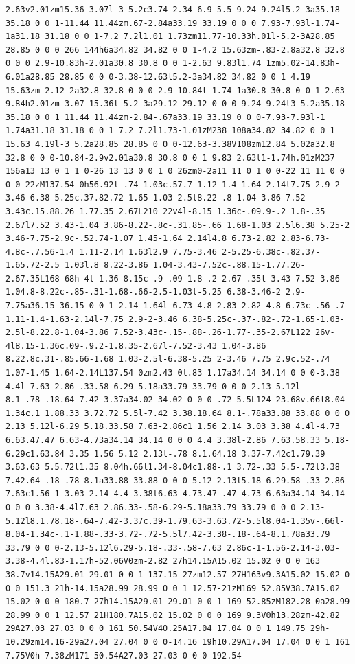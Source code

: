 \documentclass[11pt]{article}
\begin{document}
\begin{enumerate}
\begin{verbatim}
2.63v2.01zm15.36-3.07l-3-5.2c3.74-2.34 6.9-5.5 9.24-9.24l5.2 3a35.18 35.18 0 0 1-11.44 11.44zm.67-2.84a33.19 33.19 0 0 0 7.93-7.93l-1.74-1a31.18 31.18 0 0 1-7.2 7.2l1.01 1.73zm11.77-10.33h.01l-5.2-3A28.85 28.85 0 0 0 266 144h6a34.82 34.82 0 0 1-4.2 15.63zm-.83-2.8a32.8 32.8 0 0 0 2.9-10.83h-2.01a30.8 30.8 0 0 1-2.63 9.83l1.74 1zm5.02-14.83h-6.01a28.85 28.85 0 0 0-3.38-12.63l5.2-3a34.82 34.82 0 0 1 4.19 15.63zm-2.12-2a32.8 32.8 0 0 0-2.9-10.84l-1.74 1a30.8 30.8 0 0 1 2.63 9.84h2.01zm-3.07-15.36l-5.2 3a29.12 29.12 0 0 0-9.24-9.24l3-5.2a35.18 35.18 0 0 1 11.44 11.44zm-2.84-.67a33.19 33.19 0 0 0-7.93-7.93l-1 1.74a31.18 31.18 0 0 1 7.2 7.2l1.73-1.01zM238 108a34.82 34.82 0 0 1 15.63 4.19l-3 5.2a28.85 28.85 0 0 0-12.63-3.38V108zm12.84 5.02a32.8 32.8 0 0 0-10.84-2.9v2.01a30.8 30.8 0 0 1 9.83 2.63l1-1.74h.01zM237 156a13 13 0 1 1 0-26 13 13 0 0 1 0 26zm0-2a11 11 0 1 0 0-22 11 11 0 0 0 0 22zM137.54 0h56.92l-.74 1.03c.57.7 1.12 1.4 1.64 2.14l7.75-2.9 2 3.46-6.38 5.25c.37.82.72 1.65 1.03 2.5l8.22-.8 1.04 3.86-7.52 3.43c.15.88.26 1.77.35 2.67L210 22v4l-8.15 1.36c-.09.9-.2 1.8-.35 2.67l7.52 3.43-1.04 3.86-8.22-.8c-.31.85-.66 1.68-1.03 2.5l6.38 5.25-2 3.46-7.75-2.9c-.52.74-1.07 1.45-1.64 2.14l4.8 6.73-2.82 2.83-6.73-4.8c-.7.56-1.4 1.11-2.14 1.63l2.9 7.75-3.46 2-5.25-6.38c-.82.37-1.65.72-2.5 1.03l.8 8.22-3.86 1.04-3.43-7.52c-.88.15-1.77.26-2.67.35L168 68h-4l-1.36-8.15c-.9-.09-1.8-.2-2.67-.35l-3.43 7.52-3.86-1.04.8-8.22c-.85-.31-1.68-.66-2.5-1.03l-5.25 6.38-3.46-2 2.9-7.75a36.15 36.15 0 0 1-2.14-1.64l-6.73 4.8-2.83-2.82 4.8-6.73c-.56-.7-1.11-1.4-1.63-2.14l-7.75 2.9-2-3.46 6.38-5.25c-.37-.82-.72-1.65-1.03-2.5l-8.22.8-1.04-3.86 7.52-3.43c-.15-.88-.26-1.77-.35-2.67L122 26v-4l8.15-1.36c.09-.9.2-1.8.35-2.67l-7.52-3.43 1.04-3.86 8.22.8c.31-.85.66-1.68 1.03-2.5l-6.38-5.25 2-3.46 7.75 2.9c.52-.74 1.07-1.45 1.64-2.14L137.54 0zm2.43 0l.83 1.17a34.14 34.14 0 0 0-3.38 4.4l-7.63-2.86-.33.58 6.29 5.18a33.79 33.79 0 0 0-2.13 5.12l-8.1-.78-.18.64 7.42 3.37a34.02 34.02 0 0 0-.72 5.5L124 23.68v.66l8.04 1.34c.1 1.88.33 3.72.72 5.5l-7.42 3.38.18.64 8.1-.78a33.88 33.88 0 0 0 2.13 5.12l-6.29 5.18.33.58 7.63-2.86c1 1.56 2.14 3.03 3.38 4.4l-4.73 6.63.47.47 6.63-4.73a34.14 34.14 0 0 0 4.4 3.38l-2.86 7.63.58.33 5.18-6.29c1.63.84 3.35 1.56 5.12 2.13l-.78 8.1.64.18 3.37-7.42c1.79.39 3.63.63 5.5.72l1.35 8.04h.66l1.34-8.04c1.88-.1 3.72-.33 5.5-.72l3.38 7.42.64-.18-.78-8.1a33.88 33.88 0 0 0 5.12-2.13l5.18 6.29.58-.33-2.86-7.63c1.56-1 3.03-2.14 4.4-3.38l6.63 4.73.47-.47-4.73-6.63a34.14 34.14 0 0 0 3.38-4.4l7.63 2.86.33-.58-6.29-5.18a33.79 33.79 0 0 0 2.13-5.12l8.1.78.18-.64-7.42-3.37c.39-1.79.63-3.63.72-5.5l8.04-1.35v-.66l-8.04-1.34c-.1-1.88-.33-3.72-.72-5.5l7.42-3.38-.18-.64-8.1.78a33.79 33.79 0 0 0-2.13-5.12l6.29-5.18-.33-.58-7.63 2.86c-1-1.56-2.14-3.03-3.38-4.4l.83-1.17h-52.06V0zm-2.82 27h14.15A15.02 15.02 0 0 0 163 38.7v14.15A29.01 29.01 0 0 1 137.15 27zm12.57-27H163v9.3A15.02 15.02 0 0 0 151.3 21h-14.15a28.99 28.99 0 0 1 12.57-21zM169 52.85V38.7A15.02 15.02 0 0 0 180.7 27h14.15A29.01 29.01 0 0 1 169 52.85zM182.28 0a28.99 28.99 0 0 1 12.57 21H180.7A15.02 15.02 0 0 0 169 9.3V0h13.28zm-42.82 29A27.03 27.03 0 0 0 161 50.54V40.25A17.04 17.04 0 0 1 149.75 29h-10.29zm14.16-29a27.04 27.04 0 0 0-14.16 19h10.29A17.04 17.04 0 0 1 161 7.75V0h-7.38zM171 50.54A27.03 27.03 0 0 0 192.54 
\end{verbatim}
\end{enumerate}
\end{document}
